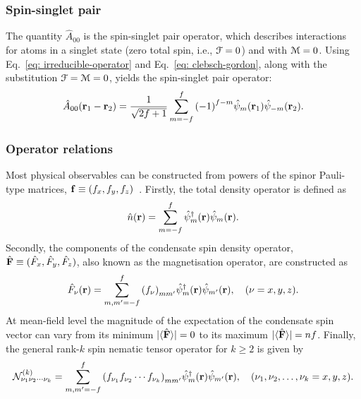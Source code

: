 \subsubsection{Spin-singlet pair}
The quantity \(\hat{A}_{00}\) is the spin-singlet pair operator, which describes
interactions for atoms in a singlet state (zero total spin, i.e.,
\(\EuScript{F} = 0\)) and with \(\EuScript{M} = 0\).
Using Eq.~\eqref{eq: irreducible-operator} and Eq.~\eqref{eq: clebsch-gordon},
along with the substitution \(\EuScript{F} = \EuScript{M} = 0\), yields the
spin-singlet pair operator:
\begin{align}
    \hat{A}_{00}(\vb{r}_1-\vb{r}_2) = \frac{1}{\sqrt{2f+1}}\sum_{m=-f}^{f}
    {(-1)}^{f-m}\hat{\psi}_m(\vb{r}_1)\hat{\psi}_{-m}(\vb{r}_2).
\end{align}

\subsubsection{Operator relations}
Most physical observables can be constructed from powers of the spinor
Pauli-type matrices, \(\vb{f} \equiv (f_x, f_y, f_z)\)~\cite{Kawaguchi2012}.
Firstly, the total density operator is defined as
\begin{align}
    \hat{n}(\vb{r}) = \sum_{m=-f}^{f}\hat{\psi}^\dagger_m(\vb{r})
    \hat{\psi}_m(\vb{r}).
\end{align}
Secondly, the components of the condensate spin density operator, \(\hat{\vb{F}}
\equiv (\hat{F}_x, \hat{F}_y, \hat{F}_z)\), also known as the magnetisation
operator, are constructed as
\begin{align}
    \hat{F}_\nu(\vb{r}) = \sum_{m,m'=-f}^{f}{\left(f_\nu\right)}_{mm'}
    \hat{\psi}^\dagger_m(\vb{r})\hat{\psi}_{m'}(\vb{r}), \quad
    (\nu = x, y, z).
\end{align}
At mean-field level the magnitude of the expectation of the condensate spin
vector can vary from its minimum \(|\langle \hat{\vb{F}} \rangle | = 0\) to its maximum
\(|\langle \hat{\vb{F}} \rangle | = nf\).
Finally, the general rank-\(k\) spin nematic tensor operator for \(k \geq 2\) is
given by
\begin{align}
    \mathcal{N}^{(k)}_{\nu_1\nu_2\cdots\nu_k} = \sum_{m,m'=-f}^{f}
    {\left(f_{\nu_1}f_{\nu_2}\cdots f_{\nu_k}\right)}_{mm'}
    \hat{\psi}^\dagger_m(\vb{r})\hat{\psi}_{m'}(\vb{r}), \quad
    (\nu_1, \nu_2, \ldots, \nu_k = x, y, z).
\end{align}

